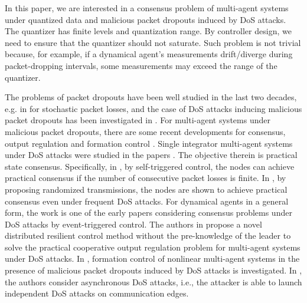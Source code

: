 \documentclass[letterpaper,journal,final,twocolumn]{IEEEtran}
\begin{document}
In this paper, we are interested in a consensus problem of multi-agent systems under quantized data and malicious packet dropouts induced by DoS attacks. The quantizer has finite levels and quantization range. By controller design, we need to ensure that the quantizer should not saturate. Such problem is not trivial because, for example, if a dynamical agent's measurements drift/diverge during packet-dropping intervals, some measurements may exceed the range of the quantizer. 


The problems of packet dropouts have been well studied in the last two decades, e.g. in \cite{you2010minimum} for stochastic packet losses, and the case of DoS attacks inducing malicious packet dropouts has been investigated in \cite{de2015input, lu2017input, feng2020tac, li2017sinr, Deng}. 
For multi-agent systems under malicious packet dropouts, there are some recent developments for consensus, output regulation and formation control \cite{senejohnny2017jamming, feng2019secure, Deng, tang2020event}. 
Single integrator multi-agent systems under DoS attacks were studied in the papers \cite{senejohnny2017jamming, cetinkaya2020randomized}. The objective therein is practical state consensus. Specifically, in \cite{senejohnny2017jamming}, by self-triggered control, the nodes can achieve practical consensus if the number of consecutive packet losses is finite. In \cite{cetinkaya2020randomized}, by proposing randomized transmissions, the nodes are shown to achieve practical consensus even under frequent DoS attacks. For dynamical agents in a general form, the work \cite{feng2019secure} is one of the early papers considering consensus problems under DoS attacks by event-triggered control. 
The authors in \cite{deng2022resilient} propose a novel distributed resilient control method without the pre-knowledge of the leader to solve the practical cooperative output regulation problem for multi-agent systems under DoS attacks.
In \cite{tang2020event}, formation control of nonlinear multi-agent systems in the presence of malicious packet dropouts induced by DoS attacks is investigated.
In \cite{lu2018distributed}, the authors consider asynchronous DoS attacks, i.e., the attacker is able to launch independent DoS attacks on communication edges. 
\end{document}

